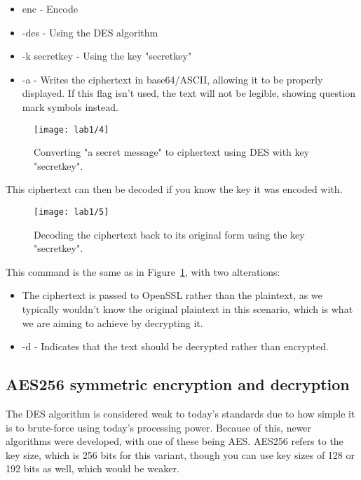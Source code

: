 \begin{itemize}
    \item enc - Encode
    \item -des - Using the DES algorithm
    \item -k secretkey - Using the key "secretkey"
    \item -a - Writes the ciphertext in base64/ASCII, allowing it to be properly displayed.
               If this flag isn't used, the text will not be legible, showing question mark symbols instead.
\end{itemize}

\begin{figure}[H]
    \centering
    \texttt{[image: lab1/4]}
    \caption{Converting "a secret message" to ciphertext using DES with key "secretkey".}
    \label{fig:DESEncrypt}
\end{figure}

This ciphertext can then be decoded if you know the key it was encoded with.

\begin{figure}[H]
    \centering
    \texttt{[image: lab1/5]}
    \caption{Decoding the ciphertext back to its original form using the key "secretkey".}
    \label{fig:DESDecrypt}
\end{figure}

This command is the same as in Figure~\ref{fig:DESEncrypt}, with two alterations:
\begin{itemize}
    \item The ciphertext is passed to OpenSSL rather than the plaintext, as we typically wouldn't know
          the original plaintext in this scenario, which is what we are aiming to achieve by decrypting it.
    \item -d - Indicates that the text should be decrypted rather than encrypted.
\end{itemize}\newline

\pagebreak

\subsection{AES256 symmetric encryption and decryption}\label{subsec:aes256}
The DES algorithm is considered weak to today's standards due to how simple it is to
brute-force using today's processing power.
Because of this, newer algorithms were developed, with one of these being AES\@.
AES256 refers to the key size, which is 256 bits for this variant, though you can use key sizes of
128 or 192 bits as well, which would be weaker.

